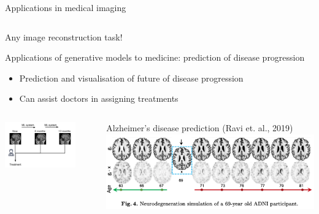 \documentclass[8pt,xcolor=table,aspectratio=169]{beamer}
\begin{document}
\begin{frame}{Applications in medical imaging}
\begin{columns}
\begin{column}{0.5\textwidth}
\end{column}
\end{columns}

\begin{center}
Any image reconstruction task!
\end{center}


\end{frame}

\begin{frame}{Applications of generative models to medicine: prediction of disease progression}

\begin{itemize}
\item Prediction and visualisation of future of disease progression
\item Can assist doctors in assigning treatments
\end{itemize}
\vspace{2em}

\begin{columns}
\begin{column}{0.5\textwidth}
\centering
\includegraphics[width=0.8\textwidth]{disprog}
\end{column}
\begin{column}{0.5\textwidth}
\centering
Alzheimer's disease prediction (Ravi et. al., 2019)
\includegraphics[width=\textwidth]{JFP3eyw.png}
\end{column}
\end{columns}

\end{frame}
\end{document}
